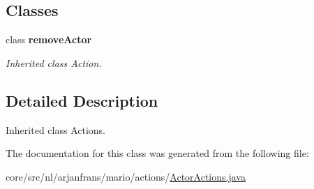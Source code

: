 \subsection*{Classes}
\begin{DoxyCompactItemize}
\item 
class {\bfseries remove\+Actor}
\begin{DoxyCompactList}\small\item\em Inherited class Action. \end{DoxyCompactList}\end{DoxyCompactItemize}


\subsection{Detailed Description}
Inherited class Actions. 

The documentation for this class was generated from the following file\+:\begin{DoxyCompactItemize}
\item 
core/src/nl/arjanfrans/mario/actions/\hyperlink{ActorActions_8java}{Actor\+Actions.\+java}\end{DoxyCompactItemize}
